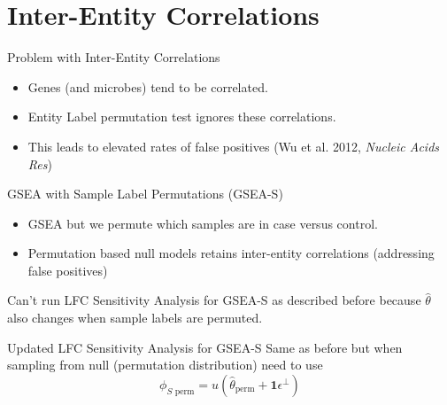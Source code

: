 \documentclass{beamer}
\begin{document}
\section{Inter-Entity Correlations}
\label{sec:orgdf10652}
\begin{frame}[label={sec:org813329d}]{Problem with Inter-Entity Correlations}
\begin{itemize}
\item Genes (and microbes) tend to be correlated.
\end{itemize}
\vfill
\begin{itemize}
\item Entity Label permutation test ignores these correlations.
\end{itemize}
\vfill
\begin{itemize}
\item This leads to elevated rates of false positives (Wu et al. 2012, \textit{Nucleic Acids Res})
\end{itemize}
\end{frame}
\begin{frame}[label={sec:orgb1ed9c2}]{GSEA with Sample Label Permutations (GSEA-S)}
\begin{itemize}
\item GSEA but we permute which samples are in case versus control.
\end{itemize}
\vfill
\begin{itemize}
\item Permutation based null models retains inter-entity correlations (addressing false positives)
\end{itemize}
\vfill
\pause
\begin{alertblock}{}
Can't run LFC Sensitivity Analysis for GSEA-S as described before because \(\hat{\theta}\) also changes when sample labels are permuted. 
\end{alertblock}
\vfill
\pause
\begin{block}{Updated LFC Sensitivity Analysis for GSEA-S}
Same as before but when sampling from null (permutation distribution) need to use
\[\phi_{S \text{ perm}}=u(\hat{\theta}_{\text{perm}} + \mathbf{1}\epsilon^{\perp})\]
\end{block}
\end{frame}
\end{document}

